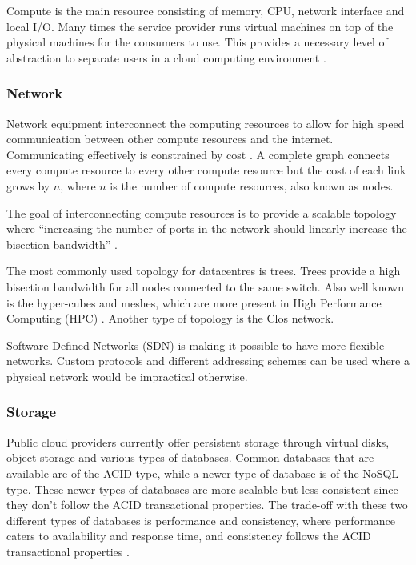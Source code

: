 \documentclass[12pt]{article}
\begin{document}
Compute is the main resource consisting of memory, CPU, network interface and local I/O. Many times the service provider runs virtual machines on top of the physical machines for the consumers to use. This provides a necessary level of abstraction to separate users in a cloud computing environment \cite{Jennings2015}.

\subsubsection{Network} \label{ssub:network}

Network equipment interconnect the computing resources to allow for high speed communication between other compute resources and the internet. Communicating effectively is constrained by cost \cite{Jennings2015}. A complete graph connects every compute resource to every other compute resource but the cost of each link grows by $n$, where $n$ is the number of compute resources, also known as nodes.

The goal of interconnecting compute resources is to provide a scalable topology where ``increasing the number of ports in the network should linearly increase the bisection bandwidth'' \cite{abts2012guided}.

The most commonly used topology for datacentres is trees. Trees provide a high bisection bandwidth for all nodes connected to the same switch. Also well known is the hyper-cubes and meshes, which are more present in High Performance Computing (HPC) \cite{Jennings2015}. Another type of topology is the Clos network. %

Software Defined Networks (SDN) is making it possible to have more flexible networks. Custom protocols and different addressing schemes can be used where a physical network would be impractical otherwise.

\subsubsection{Storage} \label{ssub:storage}


Public cloud providers currently offer persistent storage through virtual disks, object storage and various types of databases. Common databases that are available are of the ACID type, while a newer type of database is of the NoSQL type. These newer types of databases are more scalable but less consistent since they don't follow the ACID transactional properties. The trade-off with these two different types of databases is performance and consistency, where performance caters to availability and response time, and consistency follows the ACID transactional properties \cite{Jennings2015}.
\end{document}

